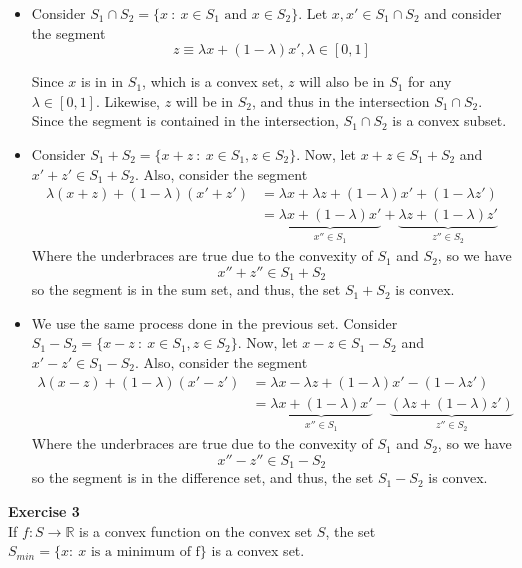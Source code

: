 \documentclass[11pt,table]{article}
\newenvironment{problem}[2][Exercise]
{ \begin{mdframed}[backgroundcolor=gray!20] \textbf{#1 #2} \\}
	{  \end{mdframed}}
\begin{document}
	\begin{itemize}
		\item Consider \(S_{1} \cap S_{2}  =  \{x \ : \ x \in S_{1} \text{ and } x \in S_{2}\}\). Let \(x,x' \in S_1 \cap S_2\) and consider the segment
		\[
		z \equiv \lambda x + (1-\lambda)x', \lambda \in [0,1]
		\]
		
		Since \(x\) is in in \(S_1\), which is a convex set, \(z\) will also be in \(S_1\) for any \(\lambda \in [0,1]\). Likewise, \(z\) will be in \(S_2\), and thus in the intersection \(S_{1} \cap S_{2}\). Since the segment is contained in the intersection, \(S_{1} \cap S_{2}\) is a convex subset.
		
		\item Consider \(S_{1} + S_{2}  =  \{x + z \ : \ x \in S_{1}, z \in S_{2}\}\). Now, let \(x+z \in S_1 + S_2\) and \(x'+z' \in S_1+S_2\). Also, consider the segment
		\begin{align*}
			\lambda(x+z) + (1-\lambda)(x'+z') & = \lambda x + \lambda z + (1-\lambda)x' + (1-\lambda z')                                                     \\
			& = \underbrace{\lambda x +(1-\lambda)x'}_{x'' \in S_1} + \underbrace{\lambda z + (1-\lambda)z'}_{z'' \in S_2}
		\end{align*}
		Where the underbraces are true due to the convexity of \(S_1\) and \(S_2\), so we have
		\[
		x'' + z'' \in S_1 + S_2
		\]
		so the segment is in the sum set, and thus, the set \(S_1 + S_2\) is convex.
		
		\item We use the same process done in the previous set. Consider \(S_{1} - S_{2}  =  \{x - z \ : \ x \in S_{1}, z \in S_{2}\}\). Now, let \(x-z \in S_1 - S_2\) and \(x'-z' \in S_1-S_2\). Also, consider the segment
		\begin{align*}
			\lambda(x-z) + (1-\lambda)(x'-z') & = \lambda x - \lambda z + (1-\lambda)x' - (1-\lambda z')                                                                   \\
			& = \underbrace{\lambda x +(1-\lambda)x'}_{x'' \in S_1} - \underbrace{\left( \lambda z + (1-\lambda)z'\right)}_{z'' \in S_2}
		\end{align*}
		Where the underbraces are true due to the convexity of \(S_1\) and \(S_2\), so we have
		\[
		x'' - z'' \in S_1 - S_2
		\]
		so the segment is in the difference set, and thus, the set \(S_1 - S_2\) is convex.
	\end{itemize}
	
	\begin{problem}{3}
		If \( f: S \to \mathbb{R} \) is a convex function on the convex set \( S \), the set \( S_{min} = \{x : \ x \text{ is a minimum of f} \} \) is a convex set.
	\end{problem}
	
\end{document}

